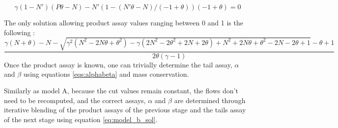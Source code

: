 \begin{equation}\label{eq:gamma_p}
\gamma(1-N')(P\theta-N) - N'(1-(N'\theta-N)/(-1+\theta))(-1+\theta) = 0
\end{equation}

The only solution allowing product assay values ranging between 0 and 1 is the
following :
\begin{equation}\label{eq:model_b_sol}
    \frac{\gamma(N + \theta) - N 
            - \sqrt{\gamma^2(N^2 
                            - 2N\theta 
                            + \theta^2) 
                    - \gamma(2N^2 - 2\theta^2 
                            + 2N + 2\theta) 
                    + N^2 + 2N\theta + \theta^2 - 2N - 2\theta + 1} 
            - \theta + 1}
        {2\theta(\gamma - 1)}
\end{equation}
Once the product assay is known, one can trivially determine the tail assay,
$\alpha$ and $\beta$ using equations \eqref{eqs:alphabeta} and mass
conservation.

Similarly as model A, because the cut values remain constant, the flows don't
need to be recomputed, and the correct assays, $\alpha$ and $\beta$ are
determined through iterative blending of the product assays of the previous
stage and the tails assay of the next stage using equation
\eqref{eq:model_b_sol}.


